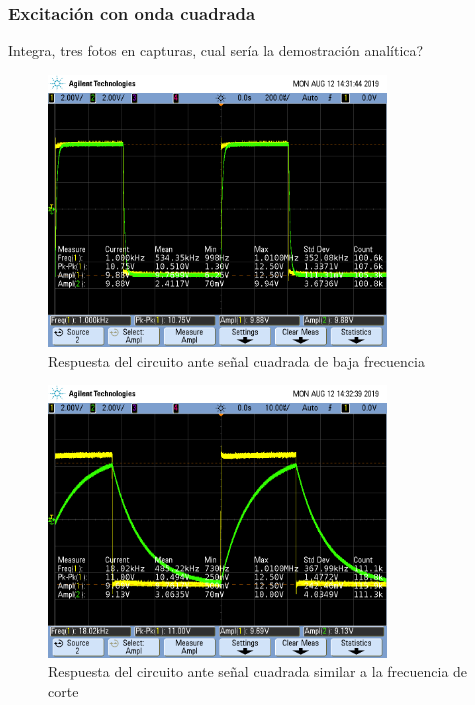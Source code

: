 \documentclass[11pt, a4paper]{article}
\begin{document}
\subsubsection*{Excitación con onda cuadrada}

Integra, tres fotos en capturas, cual sería la demostración analítica?
\begin{figure}[H]
	\centering
	\includegraphics[width=0.8\textwidth,trim={0.5cm 5cm  1 5cm},clip]{rta_onda_cuadrada_baja_f.png}
	\caption{Respuesta del circuito ante señal cuadrada de baja frecuencia} 
	\label{graf:rta_onda_cuadrada_baja_f}
\end{figure}

\begin{figure}[H]
	\centering
	\includegraphics[width=0.8\textwidth,trim={0.5cm 5cm  1 5cm},clip]{rta_onda_cuadrada_fc.png}
	\caption{Respuesta del circuito ante señal cuadrada similar a la frecuencia de corte} 
	\label{graf:rta_onda_cuadrada_fc}
\end{figure}
\end{document}
